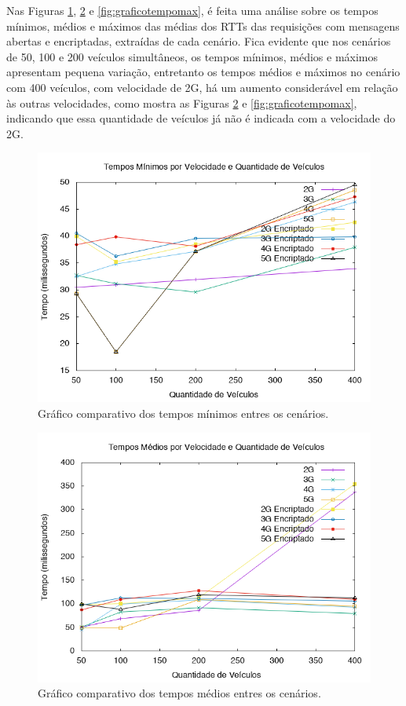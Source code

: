 \documentclass[
	12pt,				%
	oneside,			%
	a4paper,			%
	english,			%
	brazil				%
	]{abntex2ppgsi}
\begin{document}
Nas Figuras \ref{fig:graficotempomin},  \ref{fig:graficotempomedio} e  \ref{fig:graficotempomax}, é feita uma análise sobre os tempos mínimos, médios e máximos das médias dos RTTs das requisições com mensagens abertas e encriptadas, extraídas de cada cenário. Fica evidente que nos cenários de 50, 100 e 200 veículos simultâneos, os tempos mínimos, médios e máximos apresentam pequena variação, entretanto os tempos médios e máximos no cenário com 400 veículos, com velocidade de 2G, há um aumento considerável em relação às outras velocidades, como mostra as Figuras \ref{fig:graficotempomedio} e  \ref{fig:graficotempomax}, indicando que essa quantidade de veículos já não é indicada com a velocidade do 2G.

\begin{figure}[h!]
	\centering
	\includegraphics[width=0.7\columnwidth]{images/grafico_tempo_min.png}
	\caption{Gráfico comparativo dos tempos mínimos entres os cenários.}
	\label{fig:graficotempomin}
\end{figure}

\begin{figure}[h!]
	\centering
	\includegraphics[width=0.7\columnwidth]{images/grafico_tempo_medio.png}
	\caption{Gráfico comparativo dos tempos médios entres os cenários.}
	\label{fig:graficotempomedio}
\end{figure}
\end{document}
